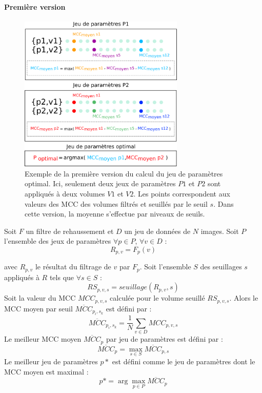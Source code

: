   \paragraph{Première version}

  \begin{figure}[!ht]
    \centering
    \includegraphics[width=0.70\textwidth]{Images/optim_v1.png}
    \caption{Exemple de la première version du calcul du jeu de paramètres optimal. Ici, seulement deux jeux de paramètres $P1$ et $P2$ sont appliqués à deux volumes $V1$ et $V2$. Les points correspondent aux valeurs des MCC des volumes filtrés et seuillés par le seuil $s$. Dans cette version, la moyenne s'effectue par niveaux de seuils.}
    \label{fig:optim_v1}
  \end{figure}

  Soit $F$ un filtre de rehaussement et $D$ un jeu de données de $N$ images. Soit $P$ l'ensemble des jeux de paramètres
  $\forall p \in P$, $\forall v \in D$ :
  \begin{equation}
    R_{p,v} = F_{p}(v)
  \end{equation}

  avec $R_{p,v}$ le résultat du filtrage de $v$ par $F_p$.
  Soit l'ensemble $S$ des seuillages $s$ appliqués à $R$ tels que $\forall s \in S$ :
  \begin{equation}
    RS_{p,v,s} = seuillage(R_{p,v},s) 
  \end{equation}
  Soit la valeur du MCC $MCC_{p,v,s}$ calculée pour le volume seuillé $RS_{p,v,s}$.
  Alors le MCC moyen par seuil $\overline{MCC}_{p_i,s_k}$ est défini par :
  \begin{equation}
    \overline{MCC}_{p_i,s_k} = \frac{1}{N}\sum_{v \in D} MCC_{p,v,s}
  \end{equation}
  Le meilleur MCC moyen $\overline{MCC}_{p}$ par jeu de paramètres est défini par : 
  \begin{equation}
    \overline{MCC}_{p} = \max_{s \in S} \overline{MCC}_{p,s}
  \end{equation}
  Le meilleur jeu de paramètres $p*$ est défini comme le jeu de paramètres dont le MCC moyen est maximal :
  \begin{equation}
    p* = \arg\max_{p \in P} \overline{MCC}_{p}
  \end{equation}

